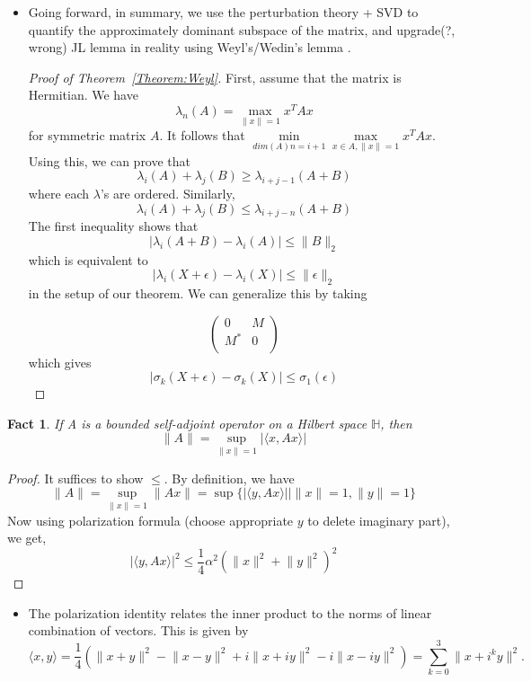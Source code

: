 \documentclass[11pt,reqno]{amsart}
\newtheorem{fact}{Fact}
\theoremstyle{remark}
\begin{document}
\begin{sloppypar}
\begin{itemize}
 \item Going forward, in summary, we use the perturbation theory 
 + SVD to quantify the approximately dominant subspace of the matrix, and upgrade(?, wrong)
 JL lemma in reality using Weyl’s/Wedin's lemma .
\begin{proof}[Proof of Theorem~\ref{Theorem:Weyl}]
First, assume that the matrix is Hermitian. We have 
\[
\lambda_n(A)=\max_{\lVert x\rVert=1}x^TAx
\]
for symmetric matrix $A$.
 It follows that $\min\limits_{dim(A)n=i+1}\max\limits_{x\in A,
\lVert x\rVert=1}x^TAx$. Using this, we can prove that
\[
\lambda_i(A)+\lambda_j(B)\geq \lambda_{i+j-1}(A+B)
\] where each $\lambda$'s are ordered.
Similarly,
\[
\lambda_i(A)+\lambda_j(B)\leq \lambda_{i+j-n}(A+B)
\]
The first inequality shows that
\[
\lvert \lambda_i(A+B)-\lambda_i(A)\rvert\leq \lVert B\rVert_2
\]
which is equivalent to
\[
  \lvert \lambda_i(X+\epsilon)-\lambda_i(X)\rvert\leq \lVert \epsilon\rVert_2
\]
in the setup of our theorem.
We can generalize this by taking

\[
\begin{pmatrix}
  0 & M \\
  M^* & 0 \\
\end{pmatrix}
\]
which gives 
\[
\lvert \sigma_k(X+\epsilon)-\sigma_k(X)\rvert\leq\sigma_1(\epsilon)
\]
\end{proof}
\end{itemize}
\begin{fact}
If A is a bounded self-adjoint operator on a Hilbert space $\mathbb{H}$, then 
\[
\lVert A\rVert = \sup\limits_{\lVert x\rVert =1}\lvert\langle x, Ax\rangle\rvert
\]
\end{fact}
\begin{proof}
It suffices to show $\leq$. 
By definition, we have 
\[
\lVert A\rVert = \sup\limits_{\lVert x\rVert=1}\lVert Ax\rVert
=\sup\{\lvert\langle y, Ax\rangle\lvert\rvert\lVert x\rVert=1, \lVert
  y\rVert=1\}
\]
Now using polarization formula (choose appropriate $y$ to delete imaginary part), we get,
\[
\vert\langle y,Ax\rangle\lvert^2\leq \frac 14\alpha^2(\lVert x\rVert^2+\lVert y\rVert^2)^2
\]
\end{proof}
\begin{itemize}
\item The polarization identity relates the inner product to the norms of linear combination of vectors. This
 is given by
\[
\langle x, y\rangle = \frac 14(\lVert x+y\rVert^2-\lVert x-y\rVert^2+i\lVert x+iy\rVert^2-i\lVert x-iy\rVert^2)
=\sum\limits^3_{k=0}\lVert x+i^ky\rVert^2.
\]
\end{itemize}


\end{sloppypar}
\end{document}
